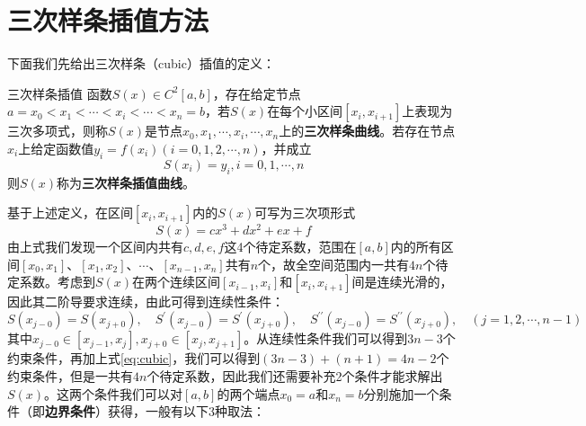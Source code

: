 \section{三次样条插值方法}
下面我们先给出三次样条（cubic）插值的定义：
\begin{definition}{三次样条插值}
	函数$S(x) \in C^2 [a, b]$，存在给定节点$a = x_0 < x_1 < \cdots < x_i < \cdots < x_n = b$，若$S(x)$在每个小区间$[x_i, x_{i+1}]$上表现为三次多项式，则称$S(x)$是节点$x_0, x_1, \cdots, x_i , \cdots, x_n$上的\textbf{三次样条曲线}。若存在节点$x_i$上给定函数值$y_i = f(x_i)(i = 0, 1, 2, \cdots, n)$，并成立
	\begin{equation}
	    S(x_i) = y_i , i = 0, 1, \cdots, n
	\end{equation} 
	则$S(x)$称为\textbf{三次样条插值曲线}。	
\end{definition}
基于上述定义，在区间$[x_i, x_{i+1}]$内的$S(x)$可写为三次项形式
\begin{equation}
	S(x) = c x^3 + d x^2 + e x + f	\label{eq:cubic}
\end{equation} 
由上式我们发现一个区间内共有$c, d, e, f$这4个待定系数，范围在$[a, b]$内的所有区间$[x_0, x_1]$、$[x_1, x_2]$、$\cdots$、$[x_{n-1}, x_{n}]$共有$n$个，故全空间范围内一共有$4n$个待定系数。考虑到$S(x)$在两个连续区间$[x_{i-1}, x_i]$和$[x_i, x_{i+1}]$间是连续光滑的，因此其二阶导要求连续，由此可得到连续性条件：
	\begin{equation*}
		S(x_{j-0}) = S(x_{j+0}), \quad S^{\prime}(x_{j-0}) = S^{\prime}(x_{j+0}),\quad S^{\prime\prime}(x_{j-0}) = S^{\prime\prime}(x_{j+0}), \quad (j = 1, 2, \cdots, n-1)
	\end{equation*} 
	其中$x_{j-0}\in [x_{j-1}, x_j], x_{j+0} \in [x_{j}, x_{j+1}]$。从连续性条件我们可以得到$3n-3$个约束条件，再加上式\eqref{eq:cubic}，我们可以得到$(3n-3) + (n + 1)= 4n - 2$个约束条件，但是一共有$4n$个待定系数，因此我们还需要补充2个条件才能求解出$S(x)$。这两个条件我们可以对$[a, b]$的两个端点$x_0 = a$和$x_n = b$分别施加一个条件（即\textbf{边界条件}）获得，一般有以下3种取法：
